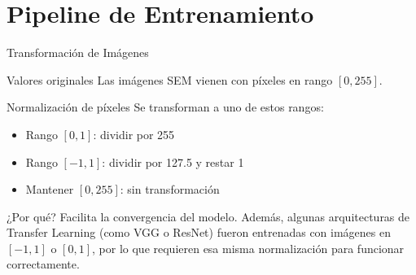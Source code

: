 \section{Pipeline de Entrenamiento}

\begin{frame}{Transformación de Imágenes}
    \begin{block}{Valores originales}
        Las imágenes SEM vienen con píxeles en rango $[0, 255]$.
    \end{block}
    
    \begin{exampleblock}{Normalización de píxeles}
        Se transforman a uno de estos rangos:
        \begin{itemize}
            \item Rango $[0, 1]$: dividir por 255
            \item Rango $[-1, 1]$: dividir por 127.5 y restar 1
            \item Mantener $[0, 255]$: sin transformación
        \end{itemize}
    \end{exampleblock}
    
    \begin{alertblock}{¿Por qué?}
        Facilita la convergencia del modelo. Además, algunas arquitecturas de Transfer Learning (como VGG o ResNet) fueron entrenadas con imágenes en $[-1,1]$ o $[0,1]$, por lo que requieren esa misma normalización para funcionar correctamente.
    \end{alertblock}
\end{frame}

